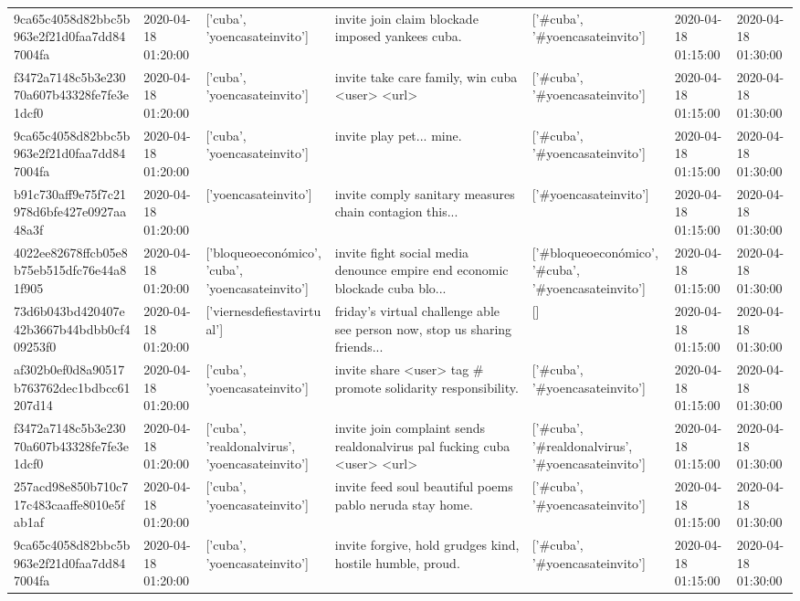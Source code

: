 \begin{tabular}{lllllll}
9ca65c4058d82bbc5b963e2f21d0faa7dd847004fa & 2020-04-18 01:20:00 & ['cuba', 'yoencasateinvito'] & invite join claim blockade imposed yankees cuba. & ['#cuba', '#yoencasateinvito'] & 2020-04-18 01:15:00 & 2020-04-18 01:30:00 \\
f3472a7148c5b3e23070a607b43328fe7fe3e1dcf0 & 2020-04-18 01:20:00 & ['cuba', 'yoencasateinvito'] & invite take care family, win cuba <user> <url> & ['#cuba', '#yoencasateinvito'] & 2020-04-18 01:15:00 & 2020-04-18 01:30:00 \\
9ca65c4058d82bbc5b963e2f21d0faa7dd847004fa & 2020-04-18 01:20:00 & ['cuba', 'yoencasateinvito'] & invite play pet... mine. & ['#cuba', '#yoencasateinvito'] & 2020-04-18 01:15:00 & 2020-04-18 01:30:00 \\
b91c730aff9e75f7c21978d6bfe427e0927aa48a3f & 2020-04-18 01:20:00 & ['yoencasateinvito'] & invite comply sanitary measures chain contagion this... & ['#yoencasateinvito'] & 2020-04-18 01:15:00 & 2020-04-18 01:30:00 \\
4022ee82678ffcb05e8b75eb515dfc76e44a81f905 & 2020-04-18 01:20:00 & ['bloqueoeconómico', 'cuba', 'yoencasateinvito'] & invite fight social media denounce empire end economic blockade cuba blo... & ['#bloqueoeconómico', '#cuba', '#yoencasateinvito'] & 2020-04-18 01:15:00 & 2020-04-18 01:30:00 \\
73d6b043bd420407e42b3667b44bdbb0cf409253f0 & 2020-04-18 01:20:00 & ['viernesdefiestavirtual'] & friday's virtual challenge able see person now, stop us sharing friends... & [] & 2020-04-18 01:15:00 & 2020-04-18 01:30:00 \\
af302b0ef0d8a90517b763762dec1bdbcc61207d14 & 2020-04-18 01:20:00 & ['cuba', 'yoencasateinvito'] & invite share <user> tag \# promote solidarity responsibility. & ['#cuba', '#yoencasateinvito'] & 2020-04-18 01:15:00 & 2020-04-18 01:30:00 \\
f3472a7148c5b3e23070a607b43328fe7fe3e1dcf0 & 2020-04-18 01:20:00 & ['cuba', 'realdonalvirus', 'yoencasateinvito'] & invite join complaint sends realdonalvirus pal fucking cuba <user> <url> & ['#cuba', '#realdonalvirus', '#yoencasateinvito'] & 2020-04-18 01:15:00 & 2020-04-18 01:30:00 \\
257acd98e850b710c717c483caaffe8010e5fab1af & 2020-04-18 01:20:00 & ['cuba', 'yoencasateinvito'] & invite feed soul beautiful poems pablo neruda stay home. & ['#cuba', '#yoencasateinvito'] & 2020-04-18 01:15:00 & 2020-04-18 01:30:00 \\
9ca65c4058d82bbc5b963e2f21d0faa7dd847004fa & 2020-04-18 01:20:00 & ['cuba', 'yoencasateinvito'] & invite forgive, hold grudges kind, hostile humble, proud. & ['#cuba', '#yoencasateinvito'] & 2020-04-18 01:15:00 & 2020-04-18 01:30:00 \\

\end{tabular}
